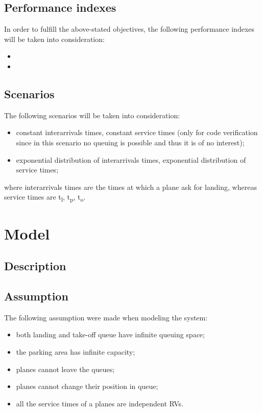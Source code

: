 \documentclass[12pt]{article}
\begin{document}
\subsection{Performance indexes}
In order to fulfill the above-stated objectives, the following performance indexes will be taken into consideration:
\begin{itemize}
	\item
	\item 
\end{itemize}

\subsection{Scenarios}
The following scenarios will be taken into consideration:
\begin{itemize}
	\item constant interarrivals times, constant service times (only for code verification since in this scenario no queuing is possible and thus it is of no interest);
	\item exponential distribution of interarrivals times, exponential distribution of service times;
\end{itemize}
where interarrivals times are the times at which a plane ask for landing, whereas service times are t\textsubscript{l}, t\textsubscript{p}, t\textsubscript{o}.


\section{Model}
\subsection{Description}

\subsection{Assumption}
The following assumption were made when modeling the system:
\begin{itemize}
	\item both landing and take-off queue have infinite queuing space;
	\item the parking area has infinite capacity;
	\item planes cannot leave the queues;
	\item planes cannot change their position in queue;
	\item all the service times of a planes are independent RVs.
\end{itemize}
\end{document}
